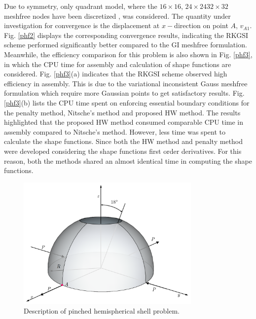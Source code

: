 Due to symmetry, only quadrant model, where the \DIFdelbegin {}\DIFdelend $16\times16$, $24\times24$\DIFdelbegin {}\DIFdelend \DIFaddbegin \DIFadd{, }\DIFaddend $32\times32$ \DIFaddbegin {}\DIFaddend meshfree nodes have been discretized \DIFaddbegin {}\DIFaddend , was considered. The quantity under investigation for convergence is the displacement at $x-$direction on point $A$, $v_{A1}$.
Fig. \ref{phf2} displays the corresponding convergence results, indicating the RKGSI scheme performed significantly better compared to the GI meshfree formulation. Meanwhile, the efficiency comparison for this problem is also shown in Fig. \ref{phf3}, in which the CPU time for assembly and calculation of shape functions are considered. Fig. \ref{phf3}(a) indicates that the RKGSI scheme observed high efficiency in assembly. This is due to the variational inconsistent Gauss meshfree formulation which require more Gaussian points to get satisfactory results. Fig. \ref{phf3}(b) lists the CPU time spent on enforcing essential boundary conditions for the penalty method, Nitsche's method and proposed HW method. The results highlighted that the proposed HW method consumed comparable CPU time in assembly compared to Nitsche's method. However, less time was spent to calculate the shape functions. Since both the HW method and penalty method were developed considering the shape functions first order derivatives. For this reason, both the methods shared an almost identical time in computing the shape functions.
\begin{figure}[!ht]
\centering
\includegraphics[width=0.8\textwidth]{figures/pfm}
\caption{Description of pinched hemispherical shell problem.}\label{phf1}
\end{figure}
